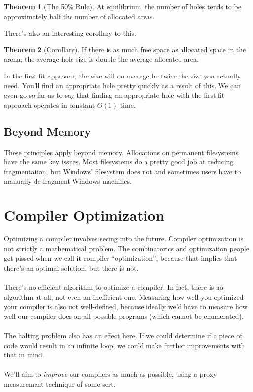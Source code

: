 \documentclass[]{article}
\theoremstyle{definition}
\newtheorem*{theorem}{Theorem}
\newcommand{\lecture}[1]{\marginpar{{\footnotesize $\leftarrow$ \underline{#1}}}}
\begin{document}
			\begin{theorem}[The 50\% Rule]
				At equilibrium, the number of holes tends to be approximately half the number of allocated areas.
			\end{theorem}
			
			There's also an interesting corollary to this.
			
			\begin{theorem}[Corollary]
				If there is as much free space as allocated space in the arena, the average hole size is double the average allocated area.
			\end{theorem}
			
			In the first fit approach, the size will on average be twice the size you actually need. You'll find an appropriate hole pretty quickly as a result of this. We can even go so far as to say that finding an appropriate hole with the first fit approach operates in constant $O(1)$ time.
		
		\subsection{Beyond Memory}
			These principles apply beyond memory. Allocations on permanent filesystems have the same key issues. Most filesystems do a pretty good job at reducing fragmentation, but Windows' filesystem does not and sometimes users have to manually de-fragment Windows machines.
	
	\section{Compiler Optimization} \lecture{April 5, 2013}
		Optimizing a compiler involves seeing into the future. Compiler optimization is not strictly a mathematical problem. The combinatorics and optimization people get pissed when we call it compiler ``optimization'', because that implies that there's an optimal solution, but there is not.
		\\ \\
		There's no efficient algorithm to optimize a compiler. In fact, there is no algorithm at all, not even an inefficient one. Measuring how well you optimized your compiler is also not well-defined, because ideally we'd have to measure how well our compiler does on all possible programs (which cannot be enumerated).
		\\ \\
		The halting problem also has an effect here. If we could determine if a piece of code would result in an infinite loop, we could make further improvements with that in mind.
		\\ \\
		We'll aim to \emph{improve} our compilers as much as possible, using a proxy measurement technique of some sort.
		
\end{document}
